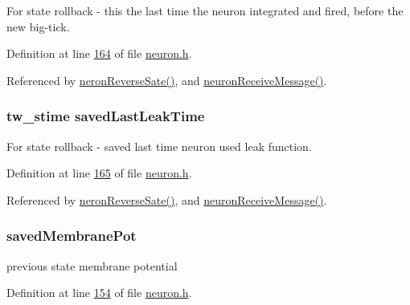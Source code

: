 For state rollback -\/ this the last time the neuron integrated and fired, before the new big-\/tick. 



Definition at line \hyperlink{neuron_8h_source_l00164}{164} of file \hyperlink{neuron_8h_source}{neuron.\+h}.



Referenced by \hyperlink{neuron_8c_source_l00232}{neron\+Reverse\+Sate()}, and \hyperlink{neuron_8c_source_l00103}{neuron\+Receive\+Message()}.

\hypertarget{structneuron_state_a50734a9ba605a083a90814b63d039a03}{}
\subsubsection[{saved\+Last\+Leak\+Time}]{\setlength{\rightskip}{0pt plus 5cm}tw\+\_\+stime saved\+Last\+Leak\+Time}\label{structneuron_state_a50734a9ba605a083a90814b63d039a03}


For state rollback -\/ saved last time neuron used leak function. 



Definition at line \hyperlink{neuron_8h_source_l00165}{165} of file \hyperlink{neuron_8h_source}{neuron.\+h}.



Referenced by \hyperlink{neuron_8c_source_l00232}{neron\+Reverse\+Sate()}, and \hyperlink{neuron_8c_source_l00103}{neuron\+Receive\+Message()}.

\hypertarget{structneuron_state_a5efe5de0478ea513ed5d90d89a49fcca}{}
\subsubsection[{saved\+Membrane\+Pot}]{ saved\+Membrane\+Pot}\label{structneuron_state_a5efe5de0478ea513ed5d90d89a49fcca}


previous state membrane potential 



Definition at line \hyperlink{neuron_8h_source_l00154}{154} of file \hyperlink{neuron_8h_source}{neuron.\+h}.



